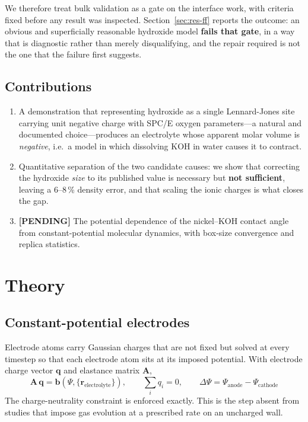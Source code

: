 \documentclass[11pt,a4paper]{article}
\newcommand{\pending}[1]{\textcolor{brick}{\textbf{[PENDING]} #1}}
\begin{document}
We therefore treat bulk validation as a gate on the interface work, with criteria fixed before any
result was inspected. Section~\ref{sec:res-ff} reports the outcome: an obvious and superficially
reasonable hydroxide model \textbf{fails that gate}, in a way that is diagnostic rather than merely
disqualifying, and the repair required is not the one that the failure first suggests.

\subsection{Contributions}
\begin{enumerate}[leftmargin=*,itemsep=1pt]
\item A demonstration that representing hydroxide as a single Lennard-Jones site carrying unit
negative charge with SPC/E oxygen parameters---a natural and documented choice---produces an
electrolyte whose apparent molar volume is \emph{negative}, i.e.\ a model in which dissolving KOH in
water causes it to contract.
\item Quantitative separation of the two candidate causes: we show that correcting the hydroxide
\emph{size} to its published value is necessary but \textbf{not sufficient}, leaving a 6--8\,\%
density error, and that scaling the ionic charges is what closes the gap.
\item \pending{The potential dependence of the nickel--KOH contact angle from constant-potential
molecular dynamics, with box-size convergence and replica statistics.}
\end{enumerate}

\section{Theory}\label{sec:theory}

\subsection{Constant-potential electrodes}
Electrode atoms carry Gaussian charges that are not fixed but solved at every timestep so that each
electrode atom sits at its imposed potential. With electrode charge vector $\mathbf{q}$ and
elastance matrix $\mathbf{A}$,
\begin{equation}
\mathbf{A}\,\mathbf{q} = \mathbf{b}\!\left(\Psi,\{\mathbf{r}_{\mathrm{electrolyte}}\}\right),
\qquad \sum_i q_i = 0, \qquad
\Delta\Psi = \Psi_{\mathrm{anode}} - \Psi_{\mathrm{cathode}}
\label{eq:conp}
\end{equation}
The charge-neutrality constraint is enforced exactly. This is the step absent from studies that
impose gas evolution at a prescribed rate on an uncharged wall.
\end{document}
